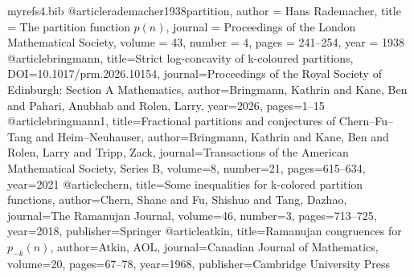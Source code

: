 \documentclass[11pt]{amsart}
\theoremstyle{plain}
\numberwithin{equation}{section}
\begin{document}
\begin{filecontents}{myrefs4.bib}
		@article{rademacher1938partition,
			author    = {Hans Rademacher},
			title     = {The partition function $p(n)$},
			journal   = {Proceedings of the London Mathematical Society},
			volume    = {43},
			number    = {4},
			pages     = {241--254},
			year      = {1938}
		}
		@article{bringmann, title={Strict log-concavity of k-coloured partitions}, DOI={10.1017/prm.2026.10154}, journal={Proceedings of the Royal Society of Edinburgh: Section A Mathematics}, author={Bringmann, Kathrin and Kane, Ben and Pahari, Anubhab and Rolen, Larry}, year={2026}, pages={1–15}}
		@article{bringmann1,
			title={Fractional partitions and conjectures of {C}hern--{F}u--{T}ang and {H}eim--{N}euhauser},
			author={Bringmann, Kathrin and Kane, Ben and Rolen, Larry and Tripp, Zack},
			journal={Transactions of the American Mathematical Society, Series B},
			volume={8},
			number={21},
			pages={615--634},
			year={2021}
		}
		@article{chern,
			title={Some inequalities for k-colored partition functions},
			author={Chern, Shane and Fu, Shishuo and Tang, Dazhao},
			journal={The Ramanujan Journal},
			volume={46},
			number={3},
			pages={713--725},
			year={2018},
			publisher={Springer}
		}
		@article{atkin,
			title={Ramanujan congruences for $p_{-k} (n)$},
			author={Atkin, AOL},
			journal={Canadian Journal of Mathematics},
			volume={20},
			pages={67--78},
			year={1968},
			publisher={Cambridge University Press}
		}
		

\end{filecontents}
\end{document}

